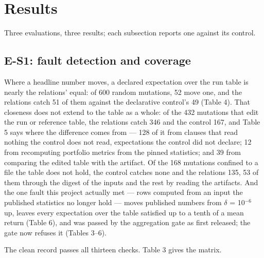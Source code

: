 \documentclass[acmsmall,screen,review]{acmart}
\begin{document}
\section{Results}

Three evaluations, three results; each subsection reports one against its control.


\subsection{E-S1: fault detection and coverage}

Where a headline number moves, a declared expectation over the run table is nearly the relations' equal: of 600 random mutations, 52 move one, and the relations catch 51 of them against the declarative control's 49 (Table 4). That closeness does not extend to the table as a whole: of the 432 mutations that edit the run or reference table, the relations catch 346 and the control 167, and Table 5 says where the difference comes from --- 128 of it from clauses that read nothing the control does not read, expectations the control did not declare; 12 from recomputing portfolio metrics from the pinned statistics; and 39 from comparing the edited table with the artifact. Of the 168 mutations confined to a file the table does not hold, the control catches none and the relations 135, 53 of them through the digest of the inputs and the rest by reading the artifacts. And the one fault this project actually met --- rows computed from an input the published statistics no longer hold --- moves published numbers from $\delta$ = 10$^{-6}$ up, leaves every expectation over the table satisfied up to a tenth of a mean return (Table 6), and was passed by the aggregation gate as first released; the gate now refuses it (Tables 3--6).


The clean record passes all thirteen checks. Table 3 gives the matrix.
\end{document}
